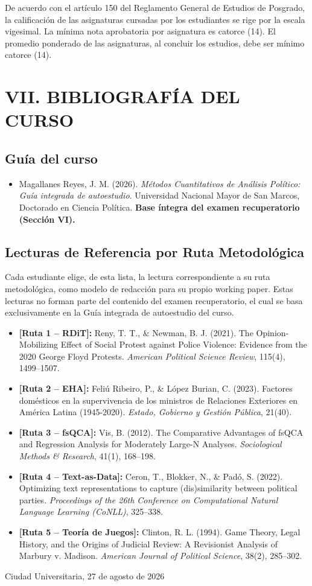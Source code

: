 \documentclass[11pt,a4paper]{article}
\begin{document}
De acuerdo con el artículo 150 del Reglamento General de Estudios de Posgrado, la calificación de las asignaturas cursadas por los estudiantes se rige por la escala vigesimal. La mínima nota aprobatoria por asignatura es catorce (14). El promedio ponderado de las asignaturas, al concluir los estudios, debe ser mínimo catorce (14).

\section{VII. BIBLIOGRAFÍA DEL CURSO}

\subsection{Guía del curso}
\begin{itemize}
    \item Magallanes Reyes, J. M. (2026). \textit{Métodos Cuantitativos de Análisis Político: Guía integrada de autoestudio}. Universidad Nacional Mayor de San Marcos, Doctorado en Ciencia Política. \textbf{Base íntegra del examen recuperatorio (Sección VI).}
\end{itemize}

\subsection{Lecturas de Referencia por Ruta Metodológica}
Cada estudiante elige, de esta lista, la lectura correspondiente a su ruta metodológica, como modelo de redacción para su propio working paper. Estas lecturas no forman parte del contenido del examen recuperatorio, el cual se basa exclusivamente en la Guía integrada de autoestudio del curso.

\begin{itemize}
    \item \textbf{[Ruta 1 -- RDiT]:} Reny, T. T., \& Newman, B. J. (2021). The Opinion-Mobilizing Effect of Social Protest against Police Violence: Evidence from the 2020 George Floyd Protests. \textit{American Political Science Review}, 115(4), 1499--1507.
    \item \textbf{[Ruta 2 -- EHA]:} Feliú Ribeiro, P., \& López Burian, C. (2023). Factores domésticos en la supervivencia de los ministros de Relaciones Exteriores en América Latina (1945-2020). \textit{Estado, Gobierno y Gestión Pública}, 21(40).
    \item \textbf{[Ruta 3 -- fsQCA]:} Vis, B. (2012). The Comparative Advantages of fsQCA and Regression Analysis for Moderately Large-N Analyses. \textit{Sociological Methods \& Research}, 41(1), 168--198.
    \item \textbf{[Ruta 4 -- Text-as-Data]:} Ceron, T., Blokker, N., \& Padó, S. (2022). Optimizing text representations to capture (dis)similarity between political parties. \textit{Proceedings of the 26th Conference on Computational Natural Language Learning (CoNLL)}, 325--338.
    \item \textbf{[Ruta 5 -- Teoría de Juegos]:} Clinton, R. L. (1994). Game Theory, Legal History, and the Origins of Judicial Review: A Revisionist Analysis of Marbury v. Madison. \textit{American Journal of Political Science}, 38(2), 285--302.
\end{itemize}

\vspace{2em}
\begin{flushright}
    Ciudad Universitaria, 27 de agosto de 2026
\end{flushright}
\end{document}
